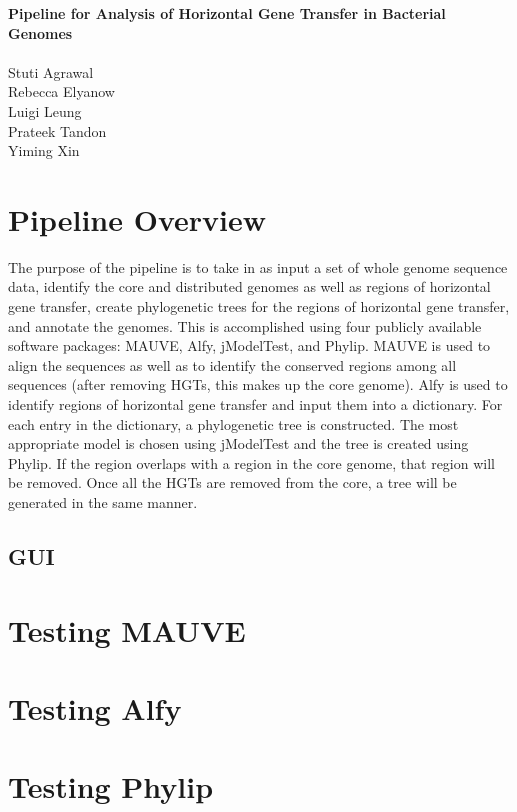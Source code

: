\documentclass[12pt]{article}
\newcommand{\tab}{\hspace*{3em}}
\begin{document}
\begin{center}
\textbf{\LARGE{Pipeline for Analysis of Horizontal Gene Transfer in Bacterial Genomes}}\\
~~~\\
\Large{Stuti Agrawal}\\
\Large{Rebecca Elyanow}\\
\Large{Luigi Leung}\\
\Large{Prateek Tandon}\\
\Large{Yiming Xin}
\end{center}
\tableofcontents
\newpage
%

\section{Pipeline Overview}
\tab The purpose of the pipeline is to take in as input a set of whole genome sequence data, identify the core and distributed genomes as well as regions of horizontal gene transfer, create phylogenetic trees for the regions of horizontal gene transfer, and annotate the genomes. This is accomplished using four publicly available software packages: MAUVE, Alfy, jModelTest, and Phylip. MAUVE is used to align the sequences as well as to identify the conserved regions among all sequences (after removing HGTs, this makes up the core genome). Alfy is used to identify regions of horizontal gene transfer and input them into a dictionary. For each entry in the dictionary, a phylogenetic tree is constructed. The most appropriate model is chosen using jModelTest and the tree is created using Phylip. If the region overlaps with a region in the core genome, that region will be removed. Once all the HGTs are removed from the core, a tree will be generated in the same manner.
\subsection{GUI}

\section{Testing MAUVE}

\section{Testing Alfy}

\section{Testing Phylip}
\end{document}

